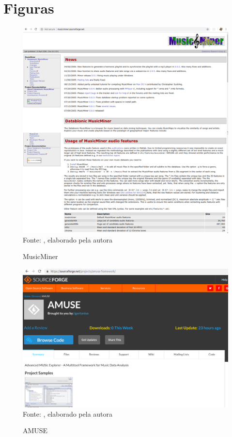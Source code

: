 \chapter{Figuras} \label{apendiceB}
\begin{figure}[!htb]
   \centering
   \caption{MusicMiner}\label{fig:musicminer} 
   \includegraphics[scale=0.30]{figuras/musicminer.png}
   \\Fonte: \cite{musicminer}, elaborado pela autora
\end{figure}

\begin{figure}[!htb]
   \centering
   \caption{AMUSE}\label{fig:amuse} 
   \includegraphics[scale=0.40]{figuras/amuse.png}
   \\Fonte: \cite{amuse}, elaborado pela autora
\end{figure}

